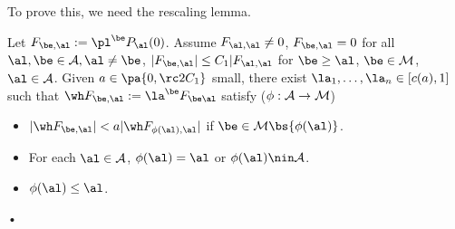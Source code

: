 To prove this, we need the rescaling lemma.
\begin{lem}
Let $F_{\be,\al} := \pl^\be P_\al(0)$. Assume $F_{\al,\al}\ne 0$, $F_{\be,\al}=0$ for all $\al,\be\in \cal A, \al \ne \be$, $|F_{\be,\al}|\le C_1|F_{\al,\al}$ for $\be \ge \al$, $\be\in \cal M$, $\al\in \cal A$. Given $a\in \pa{0,\rc 2C_1}$ small, there exist $\la_1,\ldots, \la_n\in [c(a),1]$ such that $\wh F_{\be,\al} :=\la^\be F_{\be \al}$ satisfy ($\phi:\cal A\to \cal M$)
\begin{itemize}
\item
$|\wh F_{\be,\al}|<a|\wh F_{\phi(\al),\al}|$ if $\be \in \cal M\bs \{\phi(\al)\}$.
\item
For each $\al\in \cal A$, $\phi(\al)=\al$ or $\phi(\al)\nin \cal A$.
\item
$\phi(\al)\le \al$.
\end{itemize}•
\end{lem}

